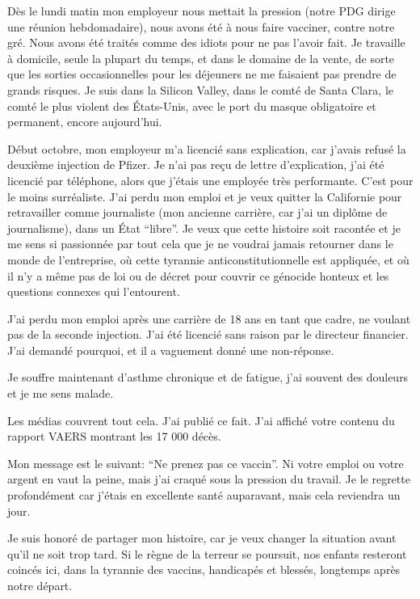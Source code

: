 Dès le lundi matin mon employeur nous mettait la pression (notre PDG dirige une
réunion hebdomadaire), nous avons été à nous faire vacciner, contre notre
gré. Nous avons été traités comme des idiots pour ne pas l'avoir fait. Je
travaille à domicile, seule la plupart du temps, et dans le domaine de la vente,
de sorte que les sorties occasionnelles pour les déjeuners ne me faisaient pas
prendre de grands risques. Je suis dans la Silicon Valley, dans le comté de
Santa Clara, le comté le plus violent des États-Unis, avec le port du masque
obligatoire et permanent, encore aujourd'hui.

Début octobre, mon employeur m'a licencié sans explication, car j'avais refusé
la deuxième injection de Pfizer. Je n'ai pas reçu de lettre d'explication, j'ai
été licencié par téléphone, alors que j'étais une employée très
performante. C'est pour le moins surréaliste. J'ai perdu mon emploi et je veux
quitter la Californie pour retravailler comme journaliste (mon ancienne
carrière, car j'ai un diplôme de journalisme), dans un État “libre”. Je veux que
cette histoire soit racontée et je me sens si passionnée par tout cela que je ne
voudrai jamais retourner dans le monde de l'entreprise, où cette tyrannie
anticonstitutionnelle est appliquée, et où il n'y a même pas de loi ou de décret
pour couvrir ce génocide honteux et les questions connexes qui l'entourent.

J'ai perdu mon emploi après une carrière de 18 ans en tant que cadre, ne voulant
pas de la seconde injection. J'ai été licencié sans raison par le directeur
financier. J'ai demandé pourquoi, et il a vaguement donné une non-réponse.

Je souffre maintenant d'asthme chronique et de fatigue, j'ai souvent des
douleurs et je me sens malade.

Les médias couvrent tout cela. J'ai publié ce fait. J'ai affiché votre contenu
du rapport VAERS montrant les 17 000 décès.

Mon message est le suivant: “Ne prenez pas ce vaccin”. Ni votre emploi ou votre
argent en vaut la peine, mais j'ai craqué sous la pression du travail. Je le
regrette profondément car j'étais en excellente santé auparavant, mais cela
reviendra un jour.

Je suis honoré de partager mon histoire, car je veux changer la situation avant
qu'il ne soit trop tard. Si le règne de la terreur se poursuit, nos enfants
resteront coincés ici, dans la tyrannie des vaccins, handicapés et blessés,
longtemps après notre départ.

